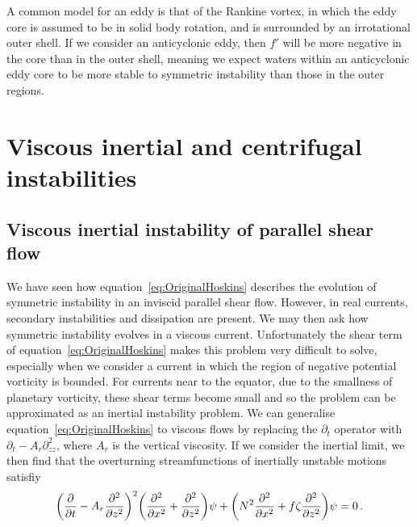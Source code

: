 A common model for an eddy is that of the Rankine vortex, in which the eddy core is assumed to be in solid body rotation, and is surrounded by an irrotational outer shell. If we consider an anticyclonic eddy, then $f'$ will be more negative in the core than in the outer shell, meaning we expect waters within an anticyclonic eddy core to be more stable to symmetric instability than those in the outer regions.





\section{Viscous inertial and centrifugal instabilities}
\label{sec:ViscousSI}
\subsection{Viscous inertial instability of parallel shear flow}
We have seen how equation~\ref{eq:OriginalHoskins} describes the evolution of symmetric instability in an inviscid parallel shear flow. However, in real currents, secondary instabilities and dissipation are present. We may then ask how symmetric instability evolves in a viscous current. Unfortunately the shear term of equation~\ref{eq:OriginalHoskins} makes this problem very difficult to solve, especially when we consider a current in which the region of negative potential vorticity is bounded. For currents near to the equator, due to the smallness of planetary vorticity, these shear terms become small and so the problem can be approximated as an inertial instability problem. We can generalise equation~\ref{eq:OriginalHoskins} to viscous flows by replacing the $\partial_t$ operator with $\partial_t - A_r \partial^2_{zz}$, where $A_r$ is the vertical viscosity. If we consider the inertial limit, we then find that the overturning streamfunctions of inertially unstable motions satisfiy
\begin{equation}
    \label{eq:BarotropicHoskins}
    \bigg(\pdv{}{t} - A_r \pdv[2]{}{z} \bigg)^2 \bigg(\pdv[2]{}{x} + \pdv[2]{}{z}\bigg) \psi + \bigg( N^2 \pdv[2]{}{x} + f \zeta \pdv[2]{}{z} \bigg) \psi = 0 \, .
\end{equation}

